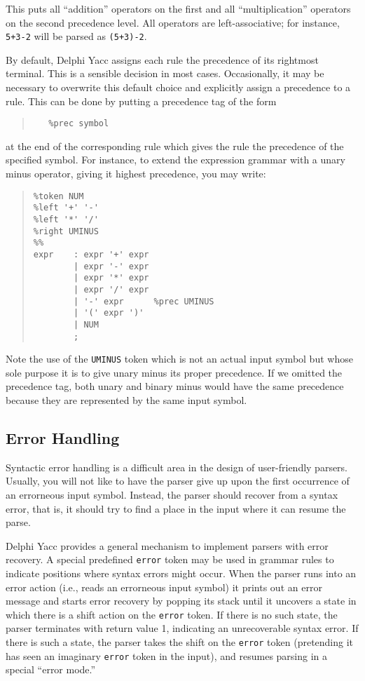 \documentclass[a4paper]{article}
\begin{document}
This puts all ``addition'' operators on the first and all ``multiplication''
operators on the second precedence level. All operators are left-associative;
for instance, \verb"5+3-2" will be parsed as \verb"(5+3)-2".

By default, Delphi Yacc assigns each rule the precedence of its rightmost
terminal. This is a sensible decision in most cases. Occasionally, it
may be necessary to overwrite this default choice and explicitly assign
a precedence to a rule. This can be done by putting a precedence tag
of the form
\begin{quote}\begin{verbatim}
   %prec symbol
\end{verbatim}\end{quote}
at the end of the corresponding rule which gives the rule the precedence
of the specified symbol. For instance, to extend the expression grammar
with a unary minus operator, giving it highest precedence, you may write:

\begin{quote}\begin{verbatim}
%token NUM
%left '+' '-'
%left '*' '/'
%right UMINUS
%%
expr    : expr '+' expr
        | expr '-' expr
        | expr '*' expr
        | expr '/' expr
        | '-' expr      %prec UMINUS
        | '(' expr ')'
        | NUM
        ;
\end{verbatim}\end{quote}

Note the use of the \verb"UMINUS" token which is not an actual input symbol
but whose sole purpose it is to give unary minus its proper precedence. If
we omitted the precedence tag, both unary and binary minus would have the
same precedence because they are represented by the same input symbol.

\subsection{Error Handling}

Syntactic error handling is a difficult area in the design of user-friendly
parsers. Usually, you will not like to have the parser give up upon the
first occurrence of an errorneous input symbol. Instead, the parser should
recover from a syntax error, that is, it should try to find a place in the
input where it can resume the parse.

Delphi Yacc provides a general mechanism to implement parsers with error
recovery. A special predefined \verb"error" token may be used in grammar rules
to indicate positions where syntax errors might occur. When the parser runs
into an error action (i.e., reads an errorneous input symbol) it prints out
an error message and starts error recovery by popping its stack until it
uncovers a state in which there is a shift action on the \verb"error" token.
If there is no such state, the parser terminates with return value 1,
indicating an unrecoverable syntax error. If there is such a state, the
parser takes the shift on the \verb"error" token (pretending it has seen
an imaginary \verb"error" token in the input), and resumes parsing in a
special ``error mode.''
\end{document}
